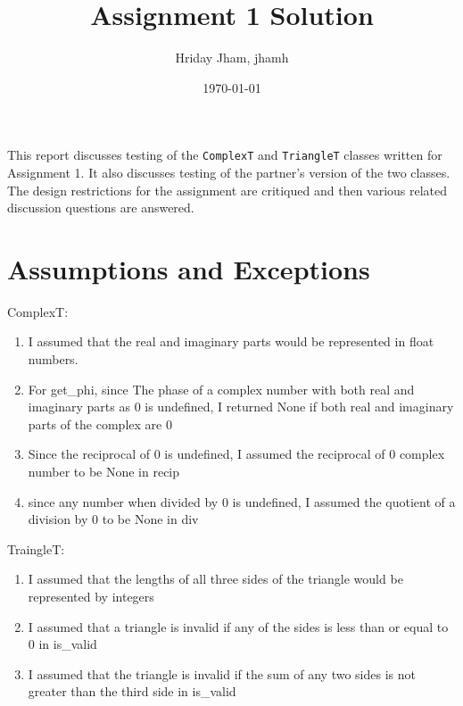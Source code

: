 \documentclass[12pt]{article}
\title{Assignment 1 Solution}
\author{Hriday Jham, jhamh}
\date{\today}
\begin{document}
\maketitle

This report discusses testing of the \verb|ComplexT| and \verb|TriangleT|
classes written for Assignment 1. It also discusses testing of the partner's
version of the two classes. The design restrictions for the assignment
are critiqued and then various related discussion questions are answered.

\section{Assumptions and Exceptions} \label{AssumptAndExcept}
ComplexT:

\begin{enumerate}

\item I assumed that the real and imaginary parts would be represented in float numbers.  

\item For get\_phi, since The phase of a complex number with both real and imaginary parts as 0 is undefined, I returned None if both real and imaginary parts of the complex are 0

\item Since the reciprocal of 0 is undefined, I assumed the reciprocal of 0 complex number to be None in recip

\item since any number when divided by 0 is undefined, I assumed the quotient of a division by 0 to be None in div

\end{enumerate}

TraingleT:

\begin{enumerate}

\item I assumed that the lengths of all three sides of the triangle would be represented by integers

\item I assumed that a triangle is invalid if any of the sides is less than or equal to 0 in is\_valid

\item I assumed that the triangle is invalid if the sum of any two sides is not greater than the third side in is\_valid

\end{enumerate}
\end{document}
